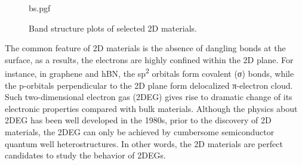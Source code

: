 \begin{figure}[htbp]
  \centering
  {bs.pgf}
  \caption{\label{fig:intro-bs} %
Band structure plots of selected 2D materials.
  }
\end{figure}


The common feature of 2D materials is the absence of dangling bonds at
the surface, as a results, the electrons are highly confined within
the 2D plane.
%
For instance, in graphene and hBN, the sp\textsuperscript{2} orbitals
form covalent (σ) bonds, while the p-orbitals perpendicular to the 2D
plane form delocalized π-electron cloud.
%
Such two-dimensional
electron gas (2DEG) gives rise to dramatic change of its electronic
properties compared with bulk materials.
%
Although the physics about 2DEG has been well developed in the 1980s,
prior to the discovery of 2D materials, the 2DEG can only be achieved
by cumbersome semiconductor quantum well heterostructures. In other
words, the 2D materials are perfect candidates to study the behavior
of 2DEGs. 

